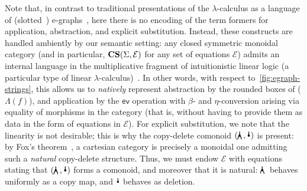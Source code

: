 Note that, in contrast to traditional presentations of the $\lambda$-calculus as a language of (slotted~\cite[Example 1]{slotted-egraphs}) e-graphs~\cite[Figure 10]{EggPaper}, here there is no encoding of the term formers for application, abstraction, and explicit substitution.
Instead, these constructs are handled ambiently by our semantic setting: any closed symmetric monoidal category (and in particular, $\mathbf{CS}(\Sigma, \mathcal{E})$ for any set of equations $\mathcal{E}$) admits an internal language in the multiplicative fragment of intuitionistic linear logic (a particular type of linear $\lambda$-calculus)~\cite[§ 1.7.3]{abramskyIntroductionCategoriesCategorical2010}.
In other words, with respect to~\autoref{fig:egraph-strings}, this allows us to \emph{natively} represent abstraction by the rounded boxes of ($\Lambda(f)$), and application by the $\textsf{ev}$ operation with $\beta$- and $\eta$-conversion arising via equality of morphisms in the category (that is, without having to provide them as data in the form of equations in $\mathcal{E}$).
For explicit substitution, we note that the linearity is not desirable; this is why the copy-delete comonoid $(\comonoid, \counit)$ is present: by Fox's theorem~\cite{foxCoalgebrasCartesianCategories1976}, a cartesian category is precisely a monoidal one admitting such a \emph{natural} copy-delete structure.
Thus, we must endow $\mathcal{E}$ with equations stating that $(\comonoid, \counit)$ forms a comonoid, and moreover that it is natural: $\comonoid$ behaves uniformly as a copy map, and $\counit$ behaves as deletion.


